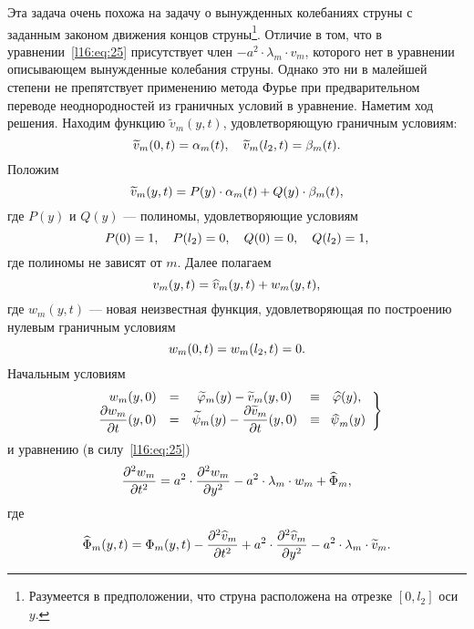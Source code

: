 Эта задача очень похожа на задачу о вынужденных колебаниях струны с заданным законом движения концов струны\footnote{Разумеется в предположении, что струна расположена на отрезке $[0,l_2]$ оси $y$.}. Отличие в том, что в уравнении~\eqref{l16:eq:25} присутствует член $-a^2\cdot\lambda_m\cdot v_m$, которого нет в уравнении описывающем вынужденные колебания струны. Однако это ни в малейшей степени не препятствует применению метода Фурье при предварительном переводе неоднородностей из граничных условий в уравнение. Наметим ход решения. Находим функцию $\widetilde{v}_m(y,t)$, удовлетворяющую граничным условиям: 
\begin{equation*}
	\hfill\widetilde{v}_m(0,t)=\alpha_m(t),\quad\widetilde{v}_m(l_2,t)=\beta_m(t).\hfill
\end{equation*}  
Положим
\begin{equation*}
	\hfill \widetilde{v}_m(y,t)=P(y)\cdot\alpha_m(t)+Q(y)\cdot\beta_m(t),\hfill
\end{equation*}
где $P(y)$ и $Q(y)$ --- полиномы, удовлетворяющие условиям 
\begin{equation*}
	\hfill P(0)=1,\quad P(l_2)=0,\quad Q(0)=0,\quad Q(l_2)=1,\hfill
\end{equation*}
где полиномы не зависят от $m$. Далее полагаем 
\begin{equation*}
	\hfill v_m(y,t)=\widehat{v}_m(y,t)+w_m(y,t),\hfill
\end{equation*}
где $w_m(y,t)$ --- новая неизвестная функция, удовлетворяющая по построению нулевым граничным условиям
\begin{equation}\label{l16:eq:28}
	\hfill w_m(0,t)=w_m(l_2,t)=0.\hfill
\end{equation}
Начальным условиям 
\begin{equation}\label{l16:eq:29}
	\hfill\left.\begin{array}{rcccl}
		w_m(y,0)&=&\widetilde{\phi}_m(y)-\widetilde{v}_m(y,0)&\equiv&\widehat{\phi}(y),\\
		\displaystyle \pder{w_m}{t}(y,0)&=&\displaystyle\widetilde{\psi}_m(y)-\pder{\widetilde{v}_m}{t}(y,0)&\equiv&\psihat_m(y)
	\end{array}\right\}\hfill
\end{equation}
и уравнению (в силу~\eqref{l16:eq:25})
\begin{equation}\label{l16:eq:30}
	\hfill\pdder{w_m}{t}=a^2\cdot\pdder{w_m}{y}-a^2\cdot\lambda_m\cdot w_m+\widehat{\Phi}_m,\hfill
\end{equation}
где 
\begin{equation*}
	\hfill\widehat{\Phi}_m(y,t)=\Phi_m(y,t)-\pdder{\widehat{v}_m}{t}+a^2\cdot\pdder{\widehat{v}_m}{y}-a^2\cdot\lambda_m\cdot \widetilde{v}_m.\hfill
\end{equation*}

